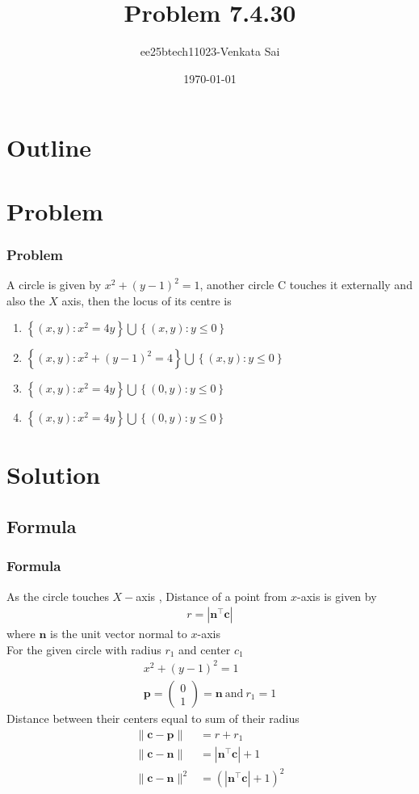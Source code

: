 \documentclass{beamer}
\title{Problem 7.4.30}
\author{ee25btech11023-Venkata Sai}
\date{\today}
\providecommand{\brak}[1]{\ensuremath{\left(#1\right)}}
\providecommand{\cbrak}[1]{\ensuremath{\left\{#1\right\}}}
\theoremstyle{remark}
\providecommand{\norm}[1]{\lVert#1\rVert}
\newcommand{\myvec}[1]{\ensuremath{\begin{pmatrix}#1\end{pmatrix}}}
\let\vec\mathbf
\numberwithin{equation}{section}
\begin{document}
\begin{frame}
\titlepage
\end{frame}

\section*{Outline}
\begin{frame}
\tableofcontents
\end{frame}

\section{Problem}

\begin{frame}
\frametitle{Problem}
A circle is given by $x^2+(y - 1)^2=1$, another circle C touches it externally and also the $X$ axis, then the locus of its centre is \\
\begin{enumerate}
\item$ \cbrak{\brak{x,y}:x^2=4y} \bigcup \cbrak{\brak{x,y}:y\leq0}$
\item  $ \cbrak{\brak{x,y}:x^2+\brak{y-1}^2 = 4} \bigcup \cbrak{\brak{x,y}:y\leq0} $
\item  $\cbrak{\brak{x,y}:x^2=4y} \bigcup \cbrak{\brak{0,y}:y\leq0}$   
\item $ \cbrak{\brak{x,y}:x^2=4y} \bigcup \cbrak{\brak{0,y}:y\leq0}$
\end{enumerate}
\end{frame}
\section{Solution}

\subsection{Formula}
\setcounter{section}{1}
\begin{frame}
\frametitle{Formula}
As the circle touches $X-$axis , Distance of a point from $x$-axis is given by
\begin{align}
    r=|\vec{n}^\top\vec{c}|
\end{align}
where $\vec{n}$ is the unit vector normal to $x$-axis\\
For the given circle with radius $r_1$ and center $c_1$
\begin{align}
 x^2+(y - 1)^2=1\\
 \vec{p}=\myvec{0\\1}=\vec{n}\ \text{and}\ r_1=1 
\end{align}
Distance between their centers equal to sum of their radius
\begin{align}
    \norm{\vec{c}-\vec{p}}&=r+r_1\\
\norm{\vec{c}-\vec{n}}&=|\vec{n}^\top\vec{c}|+1 \\
\norm{\vec{c}-\vec{n}}^2&=\brak{|\vec{n}^\top\vec{c}|+1}^2 
\end{align}
\end{frame}
\end{document}
